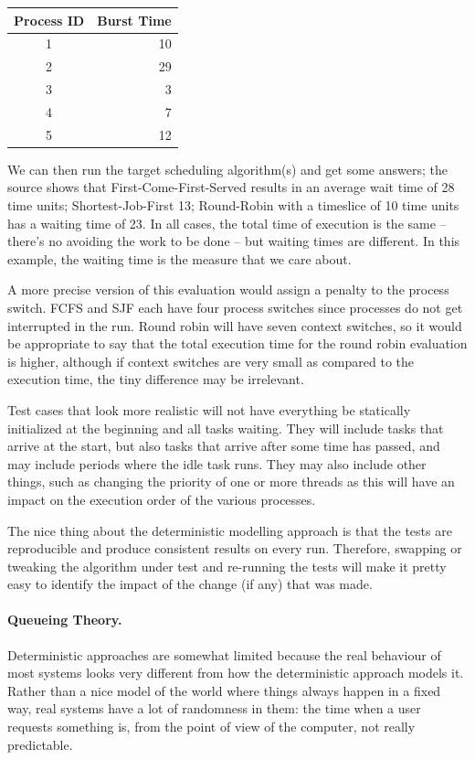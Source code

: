 \begin{center}
\begin{tabular}{c|r}
	\textbf{Process ID} & \textbf{Burst Time}\\ \hline
	1 & 10 \\
	2 & 29 \\
	3 & 3 \\
	4 & 7 \\
	5 & 12 \\
\end{tabular}
\end{center}

We can then run the target scheduling algorithm(s) and get some answers; the source shows that First-Come-First-Served results in an average wait time of 28 time units; Shortest-Job-First 13; Round-Robin with a timeslice of 10 time units has a waiting time of 23. In all cases, the total time of execution is the same -- there's no avoiding the work to be done -- but waiting times are different. In this example, the waiting time is the measure that we care about.

A more precise version of this evaluation would assign a penalty to the process switch. FCFS and SJF each have four process switches since processes do not get interrupted in the run. Round robin will have seven context switches, so it would be appropriate to say that the total execution time for the round robin evaluation is higher, although if context switches are very small as compared to the execution time, the tiny difference may be irrelevant.

Test cases that look more realistic will not have everything be statically initialized at the beginning and all tasks waiting. They will include tasks that arrive at the start, but also tasks that arrive after some time has passed, and may include periods where the idle task runs. They may also include other things, such as changing the priority of one or more threads as this will have an impact on the execution order of the various processes.

The nice thing about the deterministic modelling approach is that the tests are reproducible and produce consistent results on every run. Therefore, swapping or tweaking the algorithm under test and re-running the tests will make it pretty easy to identify the impact of the change (if any) that was made. 


\paragraph{Queueing Theory.}
Deterministic approaches are somewhat limited because the real behaviour of most systems looks very different from how the deterministic approach models it. Rather than a nice model of the world where things always happen in a fixed way, real systems have a lot of randomness in them: the time when a user requests something is, from the point of view of the computer, not really predictable. 

